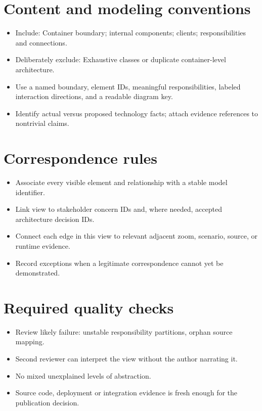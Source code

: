 \documentclass[10pt,letterpaper]{article}
\begin{document}
\section{Content and modeling conventions}
\begin{itemize}
\item Include: Container boundary; internal components; clients; responsibilities and connections.
\item Deliberately exclude: Exhaustive classes or duplicate container-level architecture.
\item Use a named boundary, element IDs, meaningful responsibilities, labeled interaction directions, and a readable diagram key.
\item Identify actual versus proposed technology facts; attach evidence references to nontrivial claims.
\end{itemize}

\section{Correspondence rules}
\begin{itemize}
\item Associate every visible element and relationship with a stable model identifier.
\item Link view to stakeholder concern IDs and, where needed, accepted architecture decision IDs.
\item Connect each edge in this view to relevant adjacent zoom, scenario, source, or runtime evidence.
\item Record exceptions when a legitimate correspondence cannot yet be demonstrated.
\end{itemize}

\section{Required quality checks}
\begin{itemize}
\item Review likely failure: unstable responsibility partitions, orphan source mapping.
\item Second reviewer can interpret the view without the author narrating it.
\item No mixed unexplained levels of abstraction.
\item Source code, deployment or integration evidence is fresh enough for the publication decision.
\end{itemize}
\end{document}
